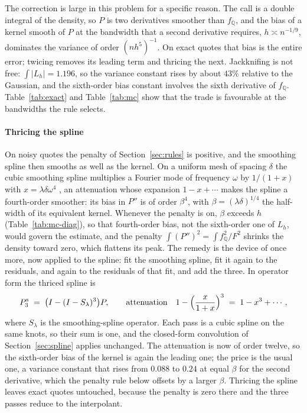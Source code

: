\documentclass[preprint,12pt,authoryear,times]{elsarticle}
\newcommand{\Q}{\mathbb{Q}}
\newcommand{\Pcs}{P^{\mathrm{s}}}
\begin{document}
The correction is large in this problem for a specific reason. The call is a double integral of the density, so \(P\) is two derivatives smoother than \(f_{\Q}\), and the bias of a kernel smooth of \(P\) at the bandwidth that a second derivative requires, \(h\asymp n^{-1/9}\), dominates the variance of order \((nh^5)^{-1}\). On exact quotes that bias is the entire error; twicing removes its leading term and thricing the next. Jackknifing is not free: \(\int|L_h|=1.196\), so the variance constant rises by about \(43\%\) relative to the Gaussian, and the sixth-order bias constant involves the sixth derivative of \(f_{\Q}\). Table~\ref{tab:exact} and Table~\ref{tab:mc} show that the trade is favourable at the bandwidths the rule selects.

\paragraph{Thricing the spline}
On noisy quotes the penalty of Section~\ref{sec:rules} is positive, and the smoothing spline then smooths as well as the kernel. On a uniform mesh of spacing \(\delta\) the cubic smoothing spline multiplies a Fourier mode of frequency \(\omega\) by \(1/(1+x)\) with \(x=\lambda\delta\omega^4\) \citep{silverman1984,green1994}, an attenuation whose expansion \(1-x+\cdots\) makes the spline a fourth-order smoother: its bias in \(P''\) is of order \(\beta^4\), with \(\beta=(\lambda\delta)^{1/4}\) the half-width of its equivalent kernel. Whenever the penalty is on, \(\beta\) exceeds \(h\) (Table~\ref{tab:mc-diag}), so that fourth-order bias, not the sixth-order one of \(L_h\), would govern the estimate, and the penalty \(\int(P'')^2=\int f_{\Q}^2/F^2\) shrinks the density toward zero, which flattens its peak. The remedy is the device of \citet{tukey1977} once more, now applied to the spline: fit the smoothing spline, fit it again to the residuals, and again to the residuals of that fit, and add the three. In operator form the thriced spline is
\begin{equation}
\label{eq:spline-thrice}
\Pcs_{3}\;=\;\bigl(I-(I-S_\lambda)^3\bigr)P,
\qquad
\text{attenuation}\quad 1-\Bigl(\frac{x}{1+x}\Bigr)^{3}\;=\;1-x^3+\cdots,
\end{equation}
where \(S_\lambda\) is the smoothing-spline operator. Each pass is a cubic spline on the same knots, so their sum is one, and the closed-form convolution of Section~\ref{sec:spline} applies unchanged. The attenuation is now of order twelve, so the sixth-order bias of the kernel is again the leading one; the price is the usual one, a variance constant that rises from \(0.088\) to \(0.24\) at equal \(\beta\) for the second derivative, which the penalty rule below offsets by a larger \(\beta\). Thricing the spline leaves exact quotes untouched, because the penalty is zero there and the three passes reduce to the interpolant.
\end{document}
